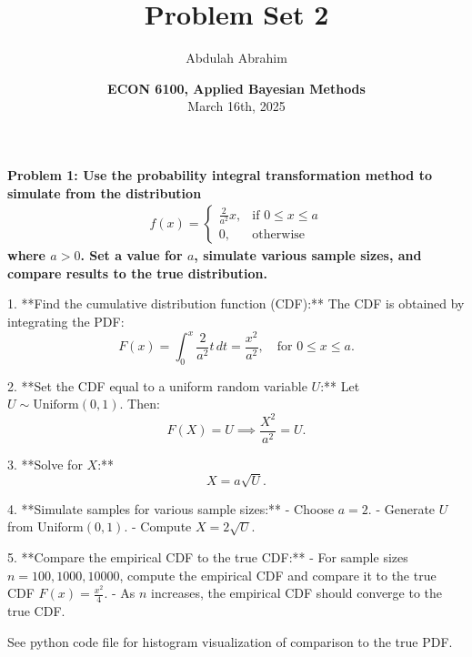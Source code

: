 \documentclass[12pt]{article}
\title{Problem Set 2} %
\date{\textbf{ECON 6100, Applied Bayesian Methods} \\ March 16th, 2025} %
\author{Abdulah Abrahim} %
\begin{document}
\maketitle

\pagestyle{myheadings} %

\pagebreak

\begin{homeworkProblem}
\textbf{Problem 1: Use the probability integral transformation method to simulate from the distribution}
\textbf{\begin{gather}
    f(x) = 
    \begin{cases}
        \frac{2}{a^2}x,  & \text{if }0\leq x\leq a \\
        0, & \text{otherwise}
    \end{cases}
\end{gather}
where \( a > 0 \). Set a value for \( a \), simulate various sample sizes, and compare results to the true distribution.}

\begin{solution}

1. **Find the cumulative distribution function (CDF):**
   The CDF is obtained by integrating the PDF:
   \[
   F(x) = \int_{0}^{x} \frac{2}{a^2} t \, dt = \frac{x^2}{a^2}, \quad \text{for } 0 \leq x \leq a.
   \]

2. **Set the CDF equal to a uniform random variable \( U \):**
   Let \( U \sim \text{Uniform}(0,1) \). Then:
   \[
   F(X) = U \implies \frac{X^2}{a^2} = U.
   \]

3. **Solve for \( X \):**
   \[
   X = a \sqrt{U}.
   \]

4. **Simulate samples for various sample sizes:**
   - Choose \( a = 2 \).
   - Generate \( U \) from \( \text{Uniform}(0,1) \).
   - Compute \( X = 2 \sqrt{U} \).

5. **Compare the empirical CDF to the true CDF:**
   - For sample sizes \( n = 100, 1000, 10000 \), compute the empirical CDF and compare it to the true CDF \( F(x) = \frac{x^2}{4} \).
   - As \( n \) increases, the empirical CDF should converge to the true CDF.

   See python code file for histogram visualization of comparison to the true PDF. 
\end{solution}
\end{homeworkProblem}

\pagebreak
\end{document}
